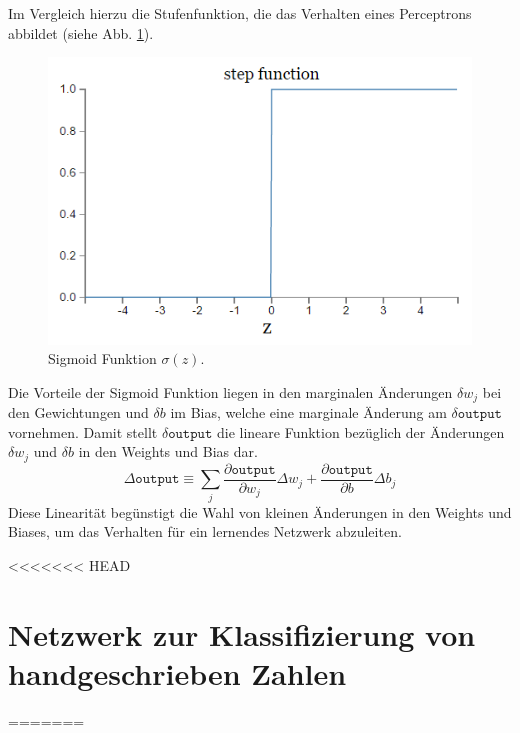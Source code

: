 \noindent
Im Vergleich hierzu die Stufenfunktion, die das Verhalten eines Perceptrons abbildet (siehe Abb. \ref{fig:perceptron_plot}).
\begin{figure}[hbt]
	\centering
	\includegraphics[scale=0.6]{Bilder/perceptron_plot}
	\caption{Sigmoid Funktion $\sigma(z)$.} 
	\label{fig:perceptron_plot} 
\end{figure}
Die Vorteile der Sigmoid Funktion liegen in den marginalen Änderungen $\delta w_j$ bei den Gewichtungen und $\delta b$ im Bias, welche eine marginale Änderung am $\delta\mathtt{output}$ vornehmen. Damit stellt $\delta\mathtt{output}$ die lineare Funktion bezüglich der Änderungen  $\delta w_j$ und $\delta b$ in den Weights und Bias dar.
\begin{equation}
	\Delta\mathtt{output} \equiv \sum_{j}{\frac{\partial\mathtt{output}}{\partial w_j}\Delta w_j+\frac{\partial\mathtt{output}}{\partial b}\Delta b_j}
\end{equation}
Diese Linearität begünstigt die Wahl von kleinen Änderungen in den Weights und Biases, um das Verhalten für ein lernendes Netzwerk abzuleiten.   

<<<<<<< HEAD
\section{Netzwerk zur Klassifizierung von handgeschrieben Zahlen}
=======
